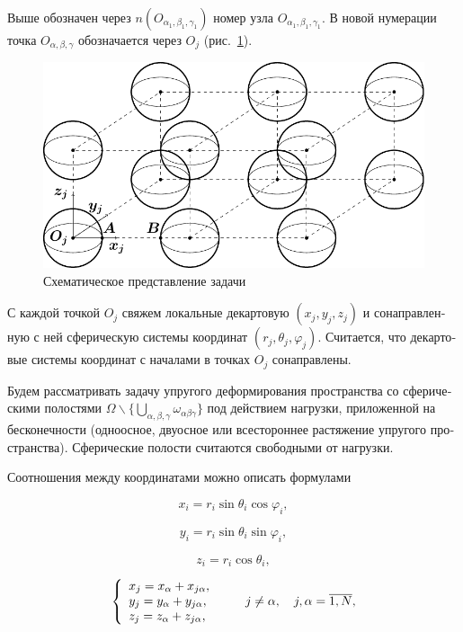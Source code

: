 \begin{russian}
Выше обозначен через $n(O_{\alpha_1,\beta_1,\gamma_1})$ номер узла $O_{\alpha_1,\beta_1,\gamma_1}$. В новой нумерации точка $O_{\alpha,\beta,\gamma}$ обозначается через $O_j$ (рис.~\ref{f:11:1}).

\begin{figure}[h!]
\centering
\includegraphics[width=12cm]{cartesian-spheres-periodic.pdf}
\caption{Схематическое представление задачи}
\label{f:11:1}
\end{figure}

С каждой точкой $O_j$ свяжем локальные декартовую $(x_j,y_j,z_j)$ и сонаправленную с ней сферическую системы координат $(r_j,\theta_j,\varphi_j)$. Считается, что декартовые системы координат с началами в точках $O_j$ сонаправлены.

Будем рассматривать задачу упругого деформирования пространства со сферическими полостями $\Omega\backslash\bigg\{\bigcup\limits_{\alpha,\beta,\gamma}\omega_{\alpha\beta\gamma}\bigg\}$ под действием нагрузки, приложенной на бесконечности (одноосное, двуосное или всестороннее растяжение упругого пространства). Сферические полости считаются свободными от нагрузки.

Соотношения между координатами можно описать формулами

\begin{equation*}
{x_i} = {r_i}\sin {\theta _i}\cos {\varphi _i},
\end{equation*}

\begin{equation}
{y_i} = {r_i}\sin {\theta _i}\sin {\varphi _i},
\label{eq:11:1}
\end{equation}

\begin{equation*}
{z_i} = {r_i}\cos {\theta _i},
\end{equation*}

\begin{equation}
\left\{ {\begin{array}{*{20}{l}}
{{x_j} = {x_\alpha } + {x_{j\alpha }},}\\
{{y_j} = {y_\alpha } + {y_{j\alpha }},}\\
{{z_j} = {z_\alpha } + {z_{j\alpha }},}
\end{array}} \right.\qquad {\kern 1pt} j \ne \alpha ,\quad j,\alpha  = \overline {1,N},
\label{eq:11:2}
\end{equation}


\end{russian}
